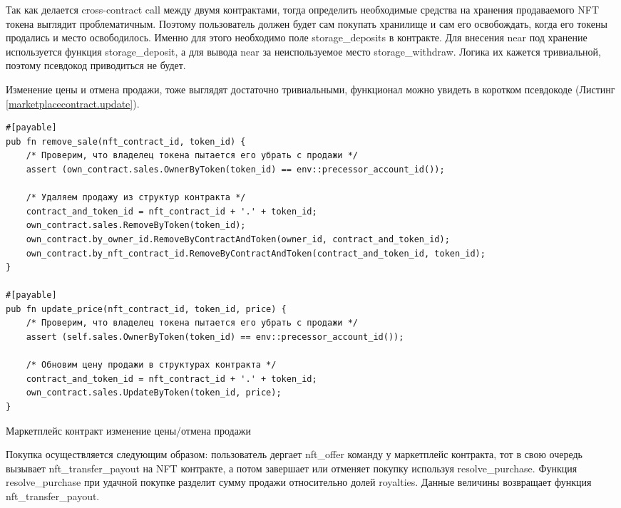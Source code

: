 Так как делается cross-contract call между двумя контрактами, тогда определить необходимые средства на хранения продаваемого NFT токена выглядит проблематичным.
Поэтому пользователь должен будет сам покупать хранилище и сам его освобождать, когда его токены продались и место освободилось. Именно для этого необходимо поле storage\_deposits в контракте.
Для внесения near под хранение используется функция storage\_deposit, а для вывода near за неиспользуемое место storage\_withdraw. Логика их кажется тривиальной, поэтому псевдокод приводиться не будет.

Изменение цены и отмена продажи, тоже выглядят достаточно тривиальными, функционал можно увидеть в коротком псевдокоде (Листинг {\color{blue}\ref{marketplacecontract.update}}).

\begin{listing}
\begin{verbatim}
#[payable]
pub fn remove_sale(nft_contract_id, token_id) {
    /* Проверим, что владелец токена пытается его убрать с продажи */
    assert (own_contract.sales.OwnerByToken(token_id) == env::precessor_account_id());

    /* Удаляем продажу из структур контракта */
    contract_and_token_id = nft_contract_id + '.' + token_id;
    own_contract.sales.RemoveByToken(token_id);
    own_contract.by_owner_id.RemoveByContractAndToken(owner_id, contract_and_token_id);
    own_contract.by_nft_contract_id.RemoveByContractAndToken(contract_and_token_id, token_id);
}

#[payable]
pub fn update_price(nft_contract_id, token_id, price) {
    /* Проверим, что владелец токена пытается его убрать с продажи */
    assert (self.sales.OwnerByToken(token_id) == env::precessor_account_id());

    /* Обновим цену продажи в структурах контракта */
    contract_and_token_id = nft_contract_id + '.' + token_id;
    own_contract.sales.UpdateByToken(token_id, price);
}
\end{verbatim}
\caption{Маркетплейс контракт изменение цены/отмена продажи}
\label{marketplacecontract.update}
\end{listing}

Покупка осуществляется следующим образом: пользователь дергает nft\_offer команду у маркетплейс контракта, тот в свою очередь вызывает nft\_transfer\_payout на NFT контракте, а потом завершает или отменяет покупку используя resolve\_purchase.
Функция resolve\_purchase при удачной покупке разделит сумму продажи относительно долей royalties. Данные величины возвращает функция nft\_transfer\_payout.

